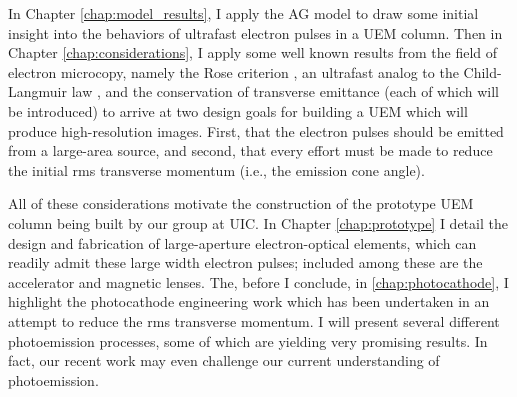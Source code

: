 In Chapter \ref{chap:model_results}, I apply the AG model to draw some initial insight into the behaviors of ultrafast electron pulses in a UEM column.
Then in Chapter \ref{chap:considerations}, I apply some well known results from the field of electron microcopy, namely the Rose criterion \cite{rose_television_1948}, an ultrafast analog to the Child-Langmuir law \cite{child_discharge_1911,langmuir_effect_1923,valfells_effects_2002}, and the conservation of transverse emittance \cite{jensen_emittance_2010} (each of which will be introduced) to arrive at two design goals for building a UEM which will produce high-resolution images.
First, that the electron pulses should be emitted from a large-area source, and second, that every effort must be made to reduce the initial rms transverse momentum (i.e., the emission cone angle).

All of these considerations motivate the construction of the prototype UEM column being built by our group at UIC.
In Chapter \ref{chap:prototype} I detail the design and fabrication of large-aperture electron-optical elements, which can readily admit these large width electron pulses; included among these are the accelerator and magnetic lenses.
The, before I conclude, in \ref{chap:photocathode}, I highlight the photocathode engineering work which has been undertaken in an attempt to reduce the rms transverse momentum.
I will present several different photoemission processes, some of which are yielding very promising results.
In fact, our recent work may even challenge our current understanding of photoemission.

